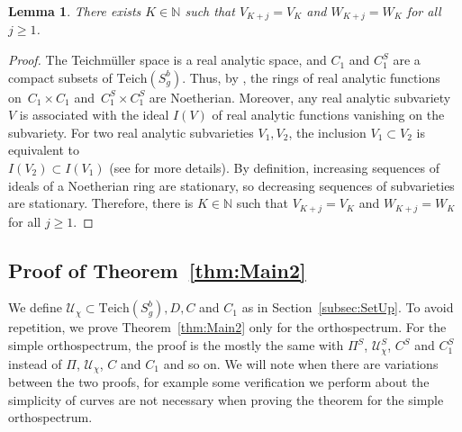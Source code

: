 \documentclass[a4paper,12pt]{article}
\newtheorem{lemme}[theorem]{Lemma}
\theoremstyle{definition}
\theoremstyle{remark}
\begin{document}
    
    
\begin{lemme}\label{lem:K}
    There exists $K \in \mathbb{N}$ such that $V_{K+j}=V_K$ and $W_{K+j}=W_K$ for all $j \geqslant 1$.
\end{lemme}

\begin{proof}
    The Teichmüller space is a real analytic space, and $C_1$ and $C_1^S$ are a compact subsets of $\mathrm{Teich}(S_g^b)$. Thus, by \cite[Théorème I.9]{JFrisch}, the rings of real analytic functions on~$C_1 \times C_1$ and~$C_1^S \times C_1^S$ are Noetherian. Moreover, any real analytic subvariety $V$ is associated with the ideal $I(V)$ of real analytic functions vanishing on the subvariety. For two real analytic subvarieties $V_1, V_2$, the inclusion $V_1 \subset V_2$ is equivalent to \\
    $I(V_2) \subset I(V_1)$ (see \cite{SousVar} for more details). By definition, increasing sequences of ideals of a Noetherian ring are stationary, so decreasing sequences of subvarieties are stationary. Therefore, there is $K \in \mathbb{N}$ such that $V_{K+j}=V_K$ and $W_{K+j}=W_K$ for all $j \geqslant 1$. 
\end{proof}
    
    
    








\subsection{Proof of Theorem~\ref{thm:Main2}}

We define $\mathcal{U}_\chi \subset \mathrm{Teich}(S_g^b), D, C$ and $C_1$ as in Section~\ref{subsec:SetUp}. To avoid repetition, we prove Theorem~\ref{thm:Main2} only for the orthospectrum. For the simple orthospectrum, the proof is the mostly the same with $\Pi^S$, $\mathcal{U}_\chi^S$, $C^S$ and $C_1^S$ instead of $\Pi$, $\mathcal{U}_\chi$, $C$ and $C_1$ and so on. We will note when there are variations between the two proofs, for example some verification we perform about the simplicity of curves are not necessary when proving the theorem for the simple orthospectrum.
\end{document}
